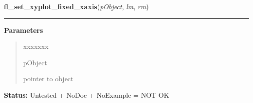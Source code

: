     \label{xformslib:library:fl_set_xyplot_fixed_xaxis}

    \vspace{0.5ex}

\hspace{.8\funcindent}\begin{boxedminipage}{\funcwidth}

    \raggedright \textbf{fl\_set\_xyplot\_fixed\_xaxis}(\textit{pObject}, \textit{lm}, \textit{rm})

    \vspace{-1.5ex}

    \rule{\textwidth}{0.5\fboxrule}
\setlength{\parskip}{2ex}
\setlength{\parskip}{1ex}
      \textbf{Parameters}
      \vspace{-1ex}

      \begin{quote}
        \begin{Ventry}{xxxxxxx}

          \item[pObject]

          pointer to object

        \end{Ventry}

      \end{quote}

\textbf{Status:} Untested + NoDoc + NoExample = NOT OK



    \end{boxedminipage}

    \label{xformslib:library:fl_set_xyplot_fixed_yaxis}

    \vspace{0.5ex}

